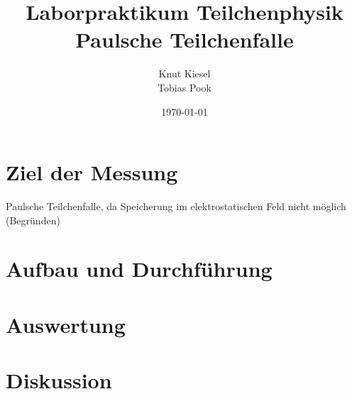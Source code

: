 \documentclass[a4paper,12pt]{article}
\title{Laborpraktikum Teilchenphysik\\ Paulsche Teilchenfalle}
\author{Knut Kiesel\\Tobias Pook}
\date{\today}
\begin{document}
\maketitle
\thispagestyle{empty}
\newpage
\tableofcontents
\setcounter{page}{1}
\newpage

\section{Ziel der Messung} %
Paulsche Teilchenfalle, da Speicherung im elektrostatischen Feld nicht möglich (Begründen)


\section{Aufbau und Durchführung}


\section{Auswertung}
\section{Diskussion}

\begin{figure}[htb]
		\centering
		\label{fig:lhc}
\end{figure}
\FloatBarrier








\end{document}
